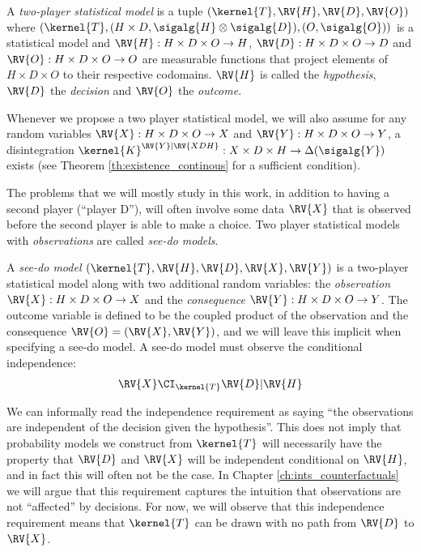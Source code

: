 \begin{definition}\label{def:2p_stat}
A \emph{two-player statistical model} is a tuple $(\kernel{T},\RV{H},\RV{D},\RV{O})$ where $(\kernel{T},(H\times D,\sigalg{H}\otimes\sigalg{D}), (O,\sigalg{O}))$ is a statistical model and $\RV{H}:H\times D\times O\to H$, $\RV{D}:H\times D\times O\to D$ and $\RV{O}:H\times D\times O\to O$ are measurable functions that project elements of $H\times D\times O$ to their respective codomains. $\RV{H}$ is called the \emph{hypothesis}, $\RV{D}$ the \emph{decision} and $\RV{O}$ the \emph{outcome}.
\end{definition}

Whenever we propose a two player statistical model, we will also assume for any random variables $\RV{X}: H\times D\times O\to X$ and $\RV{Y}:H\times D\times O\to Y$, a disintegration $\kernel{K}^{\RV{Y}|\RV{XDH}}:X\times D\times H\to \Delta(\sigalg{Y})$ exists (see Theorem \ref{th:existence_continous} for a sufficient condition).

The problems that we will mostly study in this work, in addition to having a second player (``player D''), will often involve some data $\RV{X}$ that is observed before the second player is able to make a choice. Two player statistical models with \emph{observations} are called \emph{see-do models}.

\begin{definition}\label{def:seedo}
A \emph{see-do model} $(\kernel{T},\RV{H},\RV{D},\RV{X},\RV{Y})$ is a two-player statistical model along with two additional random variables: the \emph{observation} $\RV{X}: H\times D\times O\to X$ and the \emph{consequence} $\RV{Y}:H\times D\times O\to Y$. The outcome variable is defined to be the coupled product of the observation and the consequence $\RV{O}=(\RV{X},\RV{Y})$, and we will leave this implicit when specifying a see-do model. A see-do model must observe the conditional independence:
\begin{align}
\RV{X}\CI_\kernel{T} \RV{D}|\RV{H} \label{eq:see_do_independence_requirement}
\end{align}
\end{definition}

We can informally read the independence requirement as saying ``the observations are independent of the decision given the hypothesis''. This does not imply that probability models we construct from $\kernel{T}$ will necessarily have the property that $\RV{D}$ and $\RV{X}$ will be independent conditional on $\RV{H}$, and in fact this will often not be the case. In Chapter \ref{ch:ints_counterfactuals} we will argue that this requirement captures the intuition that observations are not ``affected'' by decisions. For now, we will observe that this independence requirement means that $\kernel{T}$ can be drawn with no path from $\RV{D}$ to $\RV{X}$.

